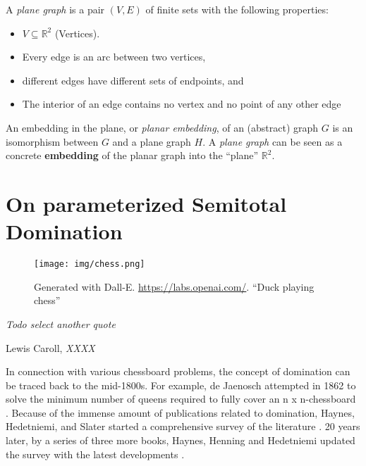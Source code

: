 \begin{graphclass}[Planar]

A \textit{plane graph} is a pair $(V,E)$ of finite sets with the following properties:

\begin{itemize}
    \item $V \subseteq \mathbb{R}^2$ (Vertices).
    \vspace{-2mm}
    \item Every edge is an arc between two vertices, 
    \vspace{-2mm}
    \item different edges have different sets of endpoints, and
    \vspace{-2mm}
    \item The interior of an edge contains no vertex and no point of any other edge
\end{itemize}

An embedding in the plane, or \textit{planar embedding}, of an (abstract) graph $G$ is an isomorphism between $G$ and a plane graph $H$. A \textit{plane graph} can be seen as a concrete \textbf{embedding} of the planar graph into the ``plane'' $\mathbb{R}^2$.

\end{graphclass}



\chapter{On parameterized Semitotal Domination}\label{ch:semitotal-domination}

\vspace*{-50pt}

\begin{figure}[ht]
        \texttt{[image: img/chess.png]}
        \captionsetup{textformat=empty,labelformat=blank}
        \caption{Generated with Dall-E. \url{https://labs.openai.com/}. ``Duck playing chess''}
\end{figure}

\epigraph{\itshape Todo select another quote}{Lewis Caroll, \textit{XXXX}}

In connection with various chessboard problems, the concept of domination can be traced back to the mid-1800s.
For example, de Jaenosch attempted in 1862 to solve the minimum number of queens required to fully cover an n x n-chessboard \cite{Jaenisch1862}. Because of the immense amount of publications related to domination, Haynes, Hedetniemi, and Slater started a comprehensive survey of the literature \cite{Haynes1998, Haynes1998b}. 
20 years later, by a series of three more books, Haynes, Henning and Hedetniemi updated the survey with the latest developments \cite{Haynes2020, Haynes2021, Haynes2022}.

